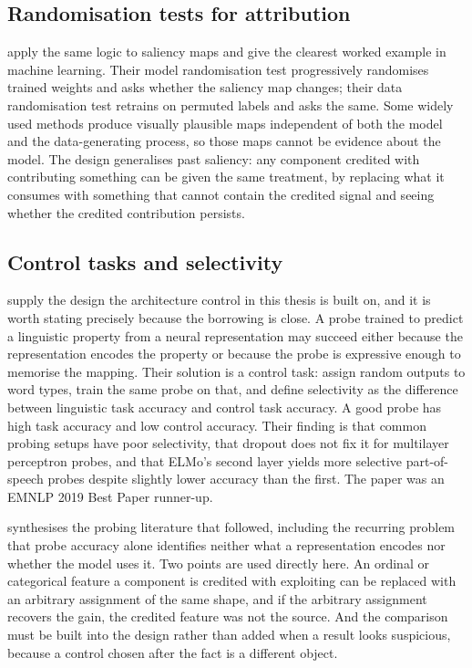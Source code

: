 \subsection{Randomisation tests for attribution}

\citet{adebayo2018sanity} apply the same logic to saliency maps and give the clearest worked
example in machine learning. Their model randomisation test progressively randomises trained
weights and asks whether the saliency map changes; their data randomisation test retrains on
permuted labels and asks the same. Some widely used methods produce visually plausible maps
independent of both the model and the data-generating process, so those maps cannot be
evidence about the model. The design generalises past saliency: any component credited with
contributing something can be given the same treatment, by replacing what it consumes with
something that cannot contain the credited signal and seeing whether the credited
contribution persists.

\subsection{Control tasks and selectivity}

\citet{hewitt2019control} supply the design the architecture control in this thesis is built
on, and it is worth stating precisely because the borrowing is close. A probe trained to
predict a linguistic property from a neural representation may succeed either because the
representation encodes the property or because the probe is expressive enough to memorise the
mapping. Their solution is a control task: assign random outputs to word types, train the
same probe on that, and define selectivity as the difference between linguistic task accuracy
and control task accuracy. A good probe has high task accuracy and low control accuracy.
Their finding is that common probing setups have poor selectivity, that dropout does not fix
it for multilayer perceptron probes, and that ELMo's second layer yields more selective
part-of-speech probes despite slightly lower accuracy than the first. The paper was an EMNLP
2019 Best Paper runner-up.

\citet{belinkov2022probing} synthesises the probing literature that followed, including the
recurring problem that probe accuracy alone identifies neither what a representation encodes
nor whether the model uses it. Two points are used directly here. An ordinal or categorical
feature a component is credited with exploiting can be replaced with an arbitrary assignment
of the same shape, and if the arbitrary assignment recovers the gain, the credited feature was
not the source. And the comparison must be built into the design rather than added when a
result looks suspicious, because a control chosen after the fact is a different object.

